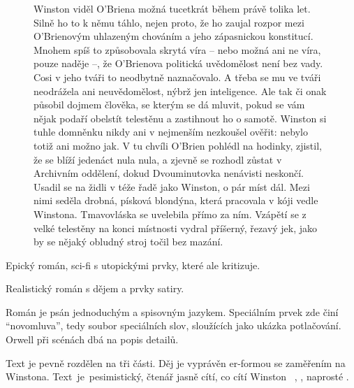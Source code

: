 \documentclass[FGBook.tex]{subfiles}
\begin{document}

\noindent\begin{figure}\footnotesize
{}
\setlength{\parindent}{3pt}\setlength{\parskip}{0.5em}
Winston viděl O’Briena možná tucetkrát během právě tolika let.
Silně ho to k němu táhlo, nejen proto, že ho zaujal rozpor mezi O’Brienovým uhlazeným chováním
a jeho zápasnickou konstitucí.
Mnohem spíš to způsobovala skrytá víra – nebo možná ani ne víra, pouze naděje –,
že O’Brienova politická uvědomělost není bez vady.
Cosi v jeho tváři to neodbytně naznačovalo.
A třeba se mu ve tváři neodrážela ani neuvědomělost, nýbrž jen inteligence.
Ale tak či onak působil dojmem člověka, se kterým se dá mluvit,
pokud se vám nějak podaří obelstít telestěnu a zastihnout ho o samotě.
Winston si tuhle domněnku nikdy ani v nejmenším nezkoušel ověřit: nebylo totiž ani možno jak.
V tu chvíli O’Brien pohlédl na hodinky, zjistil, že se blíží jedenáct nula nula,
a zjevně se rozhodl zůstat v Archivním oddělení, dokud Dvouminutovka nenávisti neskončí.
Usadil se na židli v téže řadě jako Winston, o pár míst dál.
Mezi nimi seděla drobná, písková blondýna, která pracovala v kóji vedle Winstona.
Tmavovláska se uvelebila přímo za ním.
Vzápětí se z velké telestěny na konci místnosti vydral příšerný, řezavý jek,
jako by se nějaký obludný stroj točil bez mazání.
\end{figure}


\noindent Epický román, sci-fi s utopickými prvky, které ale kritizuje.

\noindent Realistický román s  dějem a prvky satiry.

\noindent Román je psán jednoduchým a spisovným jazykem.
Speciálním prvek zde činí \enquote{novomluva},
tedy soubor speciálních slov, sloužících jako ukázka potlačování.
Orwell při scénách dbá na popis detailů.



\noindent Text je pevně rozdělen na tři části.
Děj je vyprávěn er-formou se zaměřením na Winstona.
Text~je~pesimistický, čtenář jasně cítí, co cítí Winston
\textbfhl{$\Rightarrow$}~, , naprosté .
\end{document}
